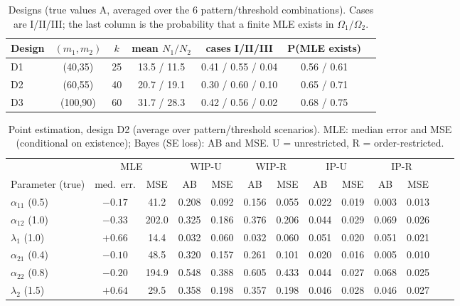 \documentclass[a4paper,11pt]{article}
\begin{document}
\begin{table}[htbp]
\centering\small
\caption{Designs (true values A, averaged over the 6 pattern/threshold combinations). Cases are I/II/III; the last column is the probability that a finite MLE exists in $\Omega_1/\Omega_2$.}\label{tab:designs}
\begin{tabular}{lcccccc}
\hline
Design & $(m_1,m_2)$ & $k$ & mean $N_1/N_2$ & cases I/II/III & P(MLE exists)\\\hline
D1 & (40,35) & 25 & 13.5 / 11.5 & 0.41 / 0.55 / 0.04 & 0.56 / 0.61\\
D2 & (60,55) & 40 & 20.7 / 19.1 & 0.30 / 0.60 / 0.10 & 0.65 / 0.71\\
D3 & (100,90) & 60 & 31.7 / 28.3 & 0.42 / 0.56 / 0.02 & 0.68 / 0.75\\\hline
\end{tabular}
\end{table}

\begin{table}[htbp]
\centering\small\setlength{\tabcolsep}{4pt}
\caption{Point estimation, design D2 (average over pattern/threshold scenarios). MLE: median error and MSE (conditional on existence); Bayes (SE loss): AB and MSE. U = unrestricted, R = order-restricted.}\label{tab:point}
\begin{tabular}{lcccccccccccc}
\hline
 & \multicolumn{2}{c}{MLE} & \multicolumn{2}{c}{WIP-U} & \multicolumn{2}{c}{WIP-R} & \multicolumn{2}{c}{IP-U} & \multicolumn{2}{c}{IP-R}\\
Parameter (true) & med.\ err. & MSE & AB & MSE & AB & MSE & AB & MSE & AB & MSE\\\hline
$\alpha_{11}$ (0.5) & $-0.17$ & 41.2 & 0.208 & 0.092 & 0.156 & 0.055 & 0.022 & 0.019 & 0.003 & 0.013\\
$\alpha_{12}$ (1.0) & $-0.33$ & 202.0 & 0.325 & 0.186 & 0.376 & 0.206 & 0.044 & 0.029 & 0.069 & 0.026\\
$\lambda_1$ (1.0) & $+0.66$ & 14.4 & 0.032 & 0.060 & 0.032 & 0.060 & 0.051 & 0.020 & 0.051 & 0.021\\
$\alpha_{21}$ (0.4) & $-0.10$ & 48.5 & 0.320 & 0.157 & 0.261 & 0.101 & 0.020 & 0.016 & 0.005 & 0.010\\
$\alpha_{22}$ (0.8) & $-0.20$ & 194.9 & 0.548 & 0.388 & 0.605 & 0.433 & 0.044 & 0.027 & 0.068 & 0.025\\
$\lambda_2$ (1.5) & $+0.64$ & 29.5 & 0.358 & 0.198 & 0.357 & 0.198 & 0.046 & 0.028 & 0.046 & 0.027\\\hline
\end{tabular}
\end{table}
\end{document}
